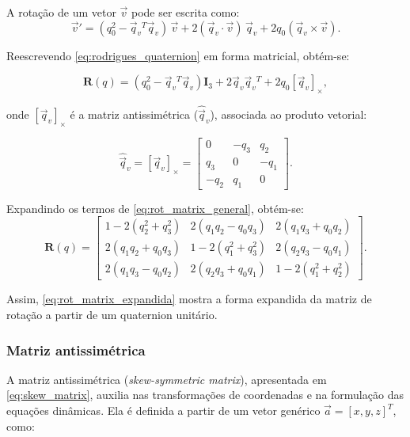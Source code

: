 A rotação de um vetor $\vec{v}$ pode ser escrita como:
\begin{equation}
\vec{v}' = (q_0^2 -
\vec q_v{^T} \vec{q}_v)\,\vec{v} 
+ 2(\vec{q}_v \cdot \vec{v})\,\vec{q}_v
+ 2q_0 (\vec{q}_v \times \vec{v}).
\label{eq:rodrigues_quaternion}
\end{equation}

Reescrevendo \eqref{eq:rodrigues_quaternion} em forma matricial, obtém-se:

\begin{equation}
\mathbf{R}(q) =
(q_0^2 - \vec{q}_v{^T} \vec{q}_v)\mathbf{I}_3 
+ 2 \vec{q}_v \vec{q}_v{^T}
+ 2q_0 [\vec{q}_v]_\times,
\label{eq:rot_matrix_general}
\end{equation}

onde $[\vec{q}_v]_\times$ é a matriz antissimétrica
($\hat{\vec{q}}_v$), associada ao produto vetorial:

\begin{equation}
\hat{\vec{q}}_v =
[\vec{q}_v]_\times =
\begin{bmatrix}
0 & -q_3 & q_2 \\
q_3 & 0 & -q_1 \\
-q_2 & q_1 & 0
\end{bmatrix}.
\label{eq:skew_matrix}
\end{equation}

Expandindo os termos de \eqref{eq:rot_matrix_general}, obtém-se:
\begin{equation}
\mathbf{R}(q) =
\begin{bmatrix}
1 - 2(q_2^2+q_3^2) & 2(q_1q_2 - q_0q_3) & 2(q_1q_3+q_0q_2) \\
2(q_1q_2+q_0q_3)   & 1 - 2(q_1^2+q_3^2) & 2(q_2q_3 - q_0q_1) \\
2(q_1q_3 - q_0q_2) & 2(q_2q_3+q_0q_1)   & 1 - 2(q_1^2+q_2^2)
\end{bmatrix}.
\label{eq:rot_matrix_expandida}
\end{equation}

Assim, \eqref{eq:rot_matrix_expandida} mostra a forma expandida da matriz de rotação a partir de um quaternion unitário.

\subsubsection{Matriz antissimétrica} 
A matriz antissimétrica (\emph{skew-symmetric matrix}), apresentada em \eqref{eq:skew_matrix}, auxilia nas transformações de coordenadas e na formulação das equações dinâmicas.  
Ela é definida a partir de um vetor genérico
$\vec{a} = [x,y,z]^T$, como:

